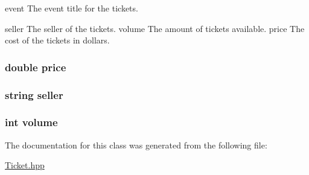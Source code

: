 event The event title for the tickets. 

seller The seller of the tickets. volume The amount of tickets available. price The cost of the tickets in dollars. \hypertarget{class_ticket_a80d1e9b73edf0b6c8aa055cb5cdaa2f2}{
\subsubsection[{price}]{\setlength{\rightskip}{0pt plus 5cm}double price\hspace{0.3cm}{\ttfamily [private]}}}\label{class_ticket_a80d1e9b73edf0b6c8aa055cb5cdaa2f2}
\hypertarget{class_ticket_a8cdc0977faad029fbb45ab09035319b9}{
\subsubsection[{seller}]{\setlength{\rightskip}{0pt plus 5cm}string seller\hspace{0.3cm}{\ttfamily [private]}}}\label{class_ticket_a8cdc0977faad029fbb45ab09035319b9}
\hypertarget{class_ticket_aed48ca0bcd2162fd4fd495873e2631f5}{
\subsubsection[{volume}]{\setlength{\rightskip}{0pt plus 5cm}int volume\hspace{0.3cm}{\ttfamily [private]}}}\label{class_ticket_aed48ca0bcd2162fd4fd495873e2631f5}


The documentation for this class was generated from the following file\-:\begin{DoxyCompactItemize}
\item 
\hyperlink{_ticket_8hpp}{Ticket.\-hpp}\end{DoxyCompactItemize}
